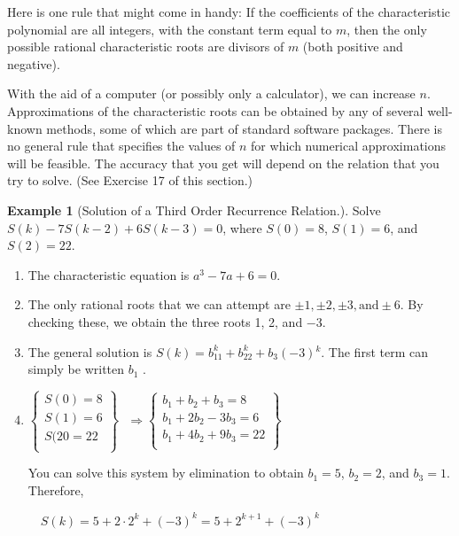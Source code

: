 \documentclass[10pt,]{book}
\theoremstyle{plain}
\theoremstyle{definition}
\theoremstyle{definition}
\theoremstyle{definition}
\newtheorem{example}[theorem]{Example}
\theoremstyle{definition}
\numberwithin{equation}{section}
\begin{document}
\par
Here is one rule that might come in handy: If the coefficients of the characteristic polynomial are all integers, with the constant
term equal to \(m\), then the only possible rational characteristic roots are divisors of \(m\) (both positive and negative).%
\par
With the aid of a computer (or possibly only a calculator), we can increase \(n\). Approximations of the characteristic roots can be obtained
by any of several well-known methods, some of which are part of standard software packages. There is no general rule that specifies the values of
\(n\) for which numerical approximations will be feasible. The accuracy that you get will depend on the relation that you try to solve. (See
Exercise 17 of this section.)%
\begin{example}[Solution of a Third Order Recurrence Relation.]\label{ex-hrr-solution-example-2}
 Solve \(S(k) - 7S(k - 2) + 6S(k - 3) = 0\), where \(S(0) =8\), \(S(1) = 6\), and \(S(2) = 22\).%
\par
\leavevmode%
\begin{enumerate}[label=\alph*]
\item\hypertarget{li-42}{} The characteristic equation is \(a^3 - 7a + 6 = 0\).%
\item\hypertarget{li-43}{}The only rational roots that we can attempt are \(\pm  1, \pm 2, \pm 3, \textrm{and} \pm 6\). By checking these, we obtain the three roots 1,
2, and $-$3.%
\item\hypertarget{li-44}{}The general solution is \(S(k) =b_11^k+b_22^k+b_3(-3){}^k\). The first term can simply be written \(b_1\) .

%
\item\hypertarget{li-45}{}\(\left\{
\begin{array}{c}
 S(0)=8 \\
 S(1)=6 \\
 S(20=22 \\
\end{array}
\right\}\textrm{   }\Rightarrow \left\{
\begin{array}{c}
 b_1+b_2+b_3=8 \\
 b_1+2b_2-3b_3=6 \\
 b_1+4b_2+9b_3=22 \\
\end{array}
\right\}\textrm{  }\)

You can solve this system by elimination to obtain \(b_1=5\), \(b_2=2\), and \(b_3=1\). Therefore,

\(\quad\)\(S(k) = 5 + 2\cdot 2^k + (-3)^k = 5 + 2^{k+1} + (-3)^k\)
%
\end{enumerate}
%
\end{example}
\end{document}
